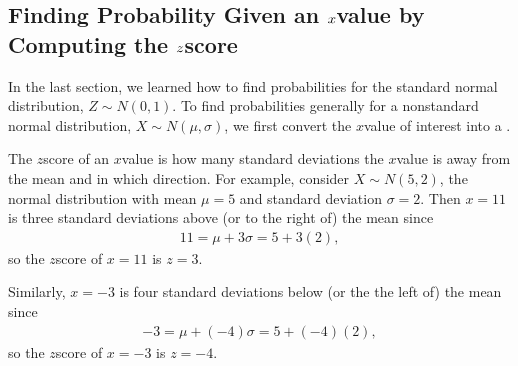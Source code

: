 \documentclass[letterpaper,10pt,english]{jupyterBook}
\begin{document}
\subsection{Finding Probability Given an \protect\(x\protect\)\sphinxhyphen{}value by Computing the \protect\(z\protect\)\sphinxhyphen{}score}
\label{\detokenize{Ch4 The Normal Distribution and the Central Limit Theorem/4.3 The Normal Distribution and z-scores:finding-probability-given-an-x-value-by-computing-the-z-score}}
\sphinxAtStartPar
In the last section, we learned how to find probabilities for the standard normal distribution, \(Z \sim N(0, 1)\). To find probabilities generally for a non\sphinxhyphen{}standard normal distribution, \(X \sim N(\mu, \sigma)\), we first convert the \(x\)\sphinxhyphen{}value of interest into a .

\sphinxAtStartPar
The \(z\)\sphinxhyphen{}score of an \(x\)\sphinxhyphen{}value is how many standard deviations the \(x\)\sphinxhyphen{}value is away from the mean and in which direction. For example, consider \(X \sim N(5, 2)\), the normal distribution with mean \(\mu = 5\) and standard deviation \(\sigma = 2\). Then \(x = 11\) is three standard deviations above (or to the right of) the mean since
\begin{equation*}
\begin{split} 11 = \mu + 3\sigma = 5 + 3(2),\end{split}
\end{equation*}
\sphinxAtStartPar
so the \(z\)\sphinxhyphen{}score of \(x = 11\) is \(z = 3\).

\sphinxAtStartPar
Similarly, \(x = -3\) is four standard deviations below (or the the left of) the mean since
\begin{equation*}
\begin{split} -3 = \mu + (-4)\sigma = 5 + (-4)(2),\end{split}
\end{equation*}
\sphinxAtStartPar
so the \(z\)\sphinxhyphen{}score of \(x = -3\) is \(z = -4\).
\end{document}
